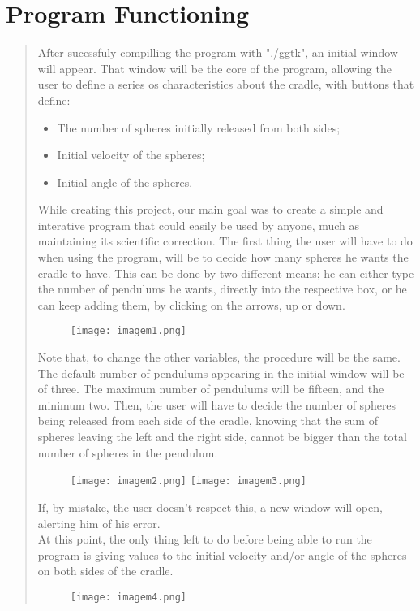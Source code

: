 \documentclass{article}
\begin{document}
\section{Program Functioning}
\begin{quote}
After sucessfuly compilling the program with "./ggtk", an initial window will appear. That window will be the core of the program, allowing the user to define a series os characteristics about the cradle, with buttons that define:  
\begin{itemize}
\item The number of spheres initially released from both sides;
\item Initial velocity of the spheres;
\item Initial angle of the spheres.
\end{itemize}
While creating this project, our main goal was to create a simple and interative program that could easily be used by anyone, much as maintaining its scientific correction.
The first thing the user will have to do when using the program, will be to decide how many spheres he wants the cradle to have. 
This can be done by two different means; he can either type the number of pendulums he wants, directly into the respective box, or he can keep adding them, by clicking on the arrows, up or down. 
\begin{figure}[hb]
  \centering
  \texttt{[image: imagem1.png]}
\end{figure}

Note that, to change the other variables, the procedure will be the same.
The default number of pendulums appearing in the initial window will be of three. The maximum number of pendulums will be fifteen, and the minimum two.
Then, the user will have to decide the number of spheres being released from each side of the cradle, knowing that the sum of spheres leaving the left and the right side, cannot be bigger than the total number of spheres in the pendulum. 
\begin{figure}[hb]
  \centering
  \texttt{[image: imagem2.png]}
  \texttt{[image: imagem3.png]}
\end{figure}

If, by mistake, the user doesn't respect this, a new window will open, alerting him of his error. \\
At this point, the only thing left to do before being able to run the program is giving values to the initial velocity and/or angle of the spheres on both sides of the cradle. 
\begin{figure}[hb]
  \centering
  \texttt{[image: imagem4.png]}
\end{figure}


\end{quote}
\end{document}
